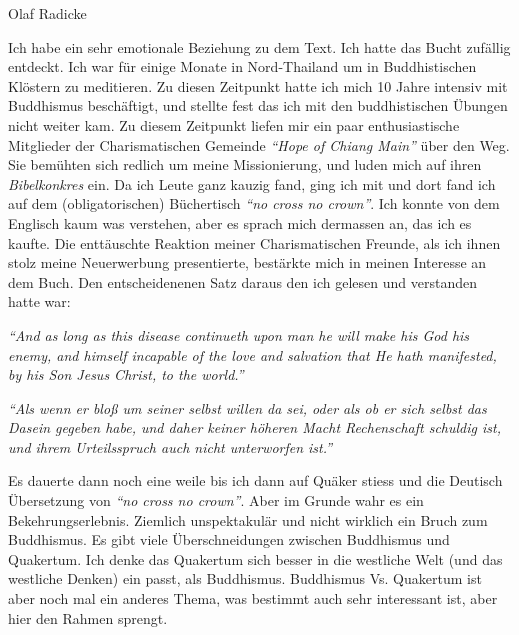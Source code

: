 \begin{flushright}
\begin{footnotesize}
Olaf Radicke
\end{footnotesize}
\end{flushright}
\smallskip

Ich habe ein sehr emotionale Beziehung zu dem Text. Ich hatte das Bucht zufällig
entdeckt. Ich war für einige Monate in Nord-Thailand um in Buddhistischen
Klöstern zu meditieren. Zu diesen Zeitpunkt hatte ich mich 10 Jahre intensiv mit
Buddhismus beschäftigt, und stellte fest das ich mit den buddhistischen Übungen
nicht weiter kam. Zu diesem Zeitpunkt liefen mir ein paar enthusiastische
Mitglieder der Charismatischen Gemeinde \textit{"`Hope of Chiang Main"'} über
den Weg. Sie bemühten sich redlich um meine Missionierung, und luden mich auf
ihren \textit{Bibelkonkres} ein. Da ich Leute ganz kauzig fand, ging ich mit und
dort fand ich auf dem (obligatorischen) Büchertisch \textit{"`no cross no crown"'}.
Ich konnte von dem Englisch kaum was verstehen, aber es sprach mich dermassen
an, das ich es kaufte. Die enttäuschte Reaktion meiner Charismatischen Freunde,
als ich ihnen stolz meine Neuerwerbung presentierte, bestärkte mich in meinen Interesse an dem Buch. Den entscheidenenen Satz daraus den ich gelesen und verstanden hatte war:

\begin{center}
\parbox{7,5cm}{
\textit{"`And as long as this disease continueth upon man he will make his God his enemy, and himself incapable of the love and salvation that He hath manifested, by his Son Jesus Christ, to the world."'}

\medskip

\textit{"`Als wenn er bloß um seiner selbst willen da sei, oder als ob er
sich selbst das Dasein gegeben habe, und daher keiner höheren Macht Rechenschaft
schuldig ist, und ihrem Urteilsspruch auch nicht unterworfen ist."'}
}
\end{center}

\medskip

Es dauerte dann noch eine weile bis ich dann auf Quäker stiess und die Deutisch
Übersetzung von \textit{"`no cross no crown"'}. Aber im Grunde wahr es ein
Bekehrungserlebnis. Ziemlich unspektakulär und nicht wirklich ein Bruch zum
Buddhismus. Es gibt viele Überschneidungen zwischen Buddhismus und Quakertum.
Ich denke das Quakertum sich besser in die westliche Welt (und das westliche
Denken) ein passt, als Buddhismus. Buddhismus Vs. Quakertum ist aber noch mal
ein anderes Thema, was bestimmt auch sehr interessant ist, aber hier den Rahmen
sprengt.


